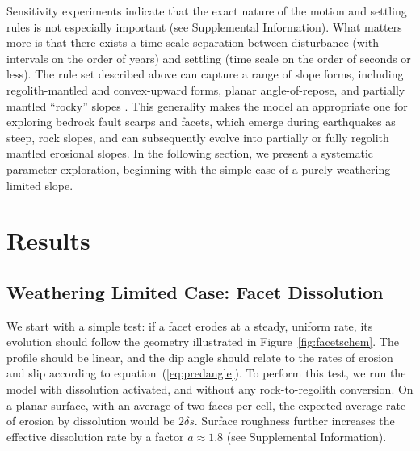 Sensitivity experiments indicate that the exact nature of the motion and settling rules is not especially important (see Supplemental Information). What matters more is that there exists a time-scale separation between disturbance (with intervals on the order of years) and settling (time scale on the order of seconds or less). The rule set described above can capture a range of slope forms, including regolith-mantled and convex-upward forms, planar angle-of-repose, and partially mantled ``rocky'' slopes \citep{tucker2018lattice}. This generality makes the model an appropriate one for exploring bedrock fault scarps and facets, which emerge during earthquakes as steep, rock slopes, and can subsequently evolve into partially or fully regolith mantled erosional slopes. In the following section, we present %
a systematic parameter exploration, beginning with the simple case of a purely weathering-limited slope.


\section{Results}

\subsection{Weathering Limited Case: Facet Dissolution}

We start with a simple test: if a facet erodes at a steady, uniform rate, its evolution should follow the geometry illustrated in Figure~\ref{fig:facetschem}. The profile should be linear, and the dip angle should relate to the rates of erosion and slip according to equation~(\ref{eq:predangle}). To perform this test, we run the model with dissolution activated, and without any rock-to-regolith conversion. On a planar surface, with an average of two faces per cell, the expected average rate of erosion by dissolution would be $2\delta s$. Surface roughness further increases the effective dissolution rate by a factor $a\approx 1.8$ (see Supplemental Information).

